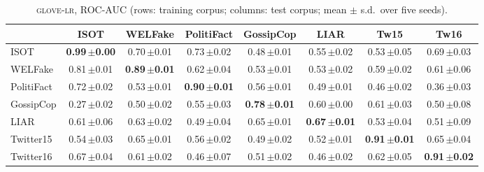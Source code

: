 \begin{table}[h]
\centering
\caption{\textsc{glove-lr}, ROC-AUC (rows: training corpus; columns: test corpus; mean $\pm$ s.d.\ over five seeds).}
\scriptsize
\begin{tabular}{@{}lccccccc@{}}
\toprule
 & ISOT & WELFake & PolitiFact & GossipCop & LIAR & Tw15 & Tw16 \\
\midrule
ISOT & \textbf{0.99\,{\tiny$\pm$0.00}} & 0.70\,{\tiny$\pm$0.01} & 0.73\,{\tiny$\pm$0.02} & 0.48\,{\tiny$\pm$0.01} & 0.55\,{\tiny$\pm$0.02} & 0.53\,{\tiny$\pm$0.05} & 0.69\,{\tiny$\pm$0.03} \\
WELFake & 0.81\,{\tiny$\pm$0.01} & \textbf{0.89\,{\tiny$\pm$0.01}} & 0.62\,{\tiny$\pm$0.04} & 0.53\,{\tiny$\pm$0.01} & 0.53\,{\tiny$\pm$0.02} & 0.59\,{\tiny$\pm$0.02} & 0.61\,{\tiny$\pm$0.06} \\
PolitiFact & 0.72\,{\tiny$\pm$0.02} & 0.53\,{\tiny$\pm$0.01} & \textbf{0.90\,{\tiny$\pm$0.01}} & 0.56\,{\tiny$\pm$0.01} & 0.49\,{\tiny$\pm$0.01} & 0.46\,{\tiny$\pm$0.02} & 0.36\,{\tiny$\pm$0.03} \\
GossipCop & 0.27\,{\tiny$\pm$0.02} & 0.50\,{\tiny$\pm$0.02} & 0.55\,{\tiny$\pm$0.03} & \textbf{0.78\,{\tiny$\pm$0.01}} & 0.60\,{\tiny$\pm$0.00} & 0.61\,{\tiny$\pm$0.03} & 0.50\,{\tiny$\pm$0.08} \\
LIAR & 0.61\,{\tiny$\pm$0.06} & 0.63\,{\tiny$\pm$0.02} & 0.49\,{\tiny$\pm$0.04} & 0.65\,{\tiny$\pm$0.01} & \textbf{0.67\,{\tiny$\pm$0.01}} & 0.53\,{\tiny$\pm$0.04} & 0.51\,{\tiny$\pm$0.09} \\
Twitter15 & 0.54\,{\tiny$\pm$0.03} & 0.65\,{\tiny$\pm$0.01} & 0.56\,{\tiny$\pm$0.02} & 0.49\,{\tiny$\pm$0.02} & 0.52\,{\tiny$\pm$0.01} & \textbf{0.91\,{\tiny$\pm$0.01}} & 0.65\,{\tiny$\pm$0.04} \\
Twitter16 & 0.67\,{\tiny$\pm$0.04} & 0.61\,{\tiny$\pm$0.02} & 0.46\,{\tiny$\pm$0.07} & 0.51\,{\tiny$\pm$0.02} & 0.46\,{\tiny$\pm$0.02} & 0.62\,{\tiny$\pm$0.05} & \textbf{0.91\,{\tiny$\pm$0.02}} \\
\bottomrule
\end{tabular}
\end{table}

